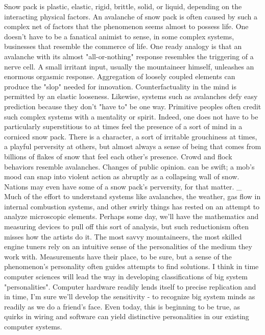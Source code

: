   Snow pack is plastic, elastic, rigid, brittle, solid, or liquid, depending on the
  interacting physical factors.
      An avalanche of snow pack is often caused by such a complex net of factors
  that the phenomenon seems almost to possess life. One doesn't have to be a
  fanatical animist to sense, in some complex systems, businesses that resemble
  the commerce of life. One ready analogy is that an avalanche with its almost
  "all-or-nothing" response resembles the triggering of a nerve cell. A small
  irritant input, usually the mountaineer himself, unleashes an enormous orgasmic
  response.
      Aggregation of loosely coupled elements can produce the "slop" needed for
  innovation. Counterfactuality in the mind is permitted by an elastic looseness.
  Likewise, systems such as avalanches defy easy prediction because they don't
  "have to" be one way.
      Primitive peoples often credit such complex systems with a mentality or
  spirit. Indeed, one does not have to be particularly superstitious to at times feel
  the presence of a sort of mind in a corniced snow pack. There is a character, a
  sort of irritable grouchiness at times, a playful perversity at others, but almost
  always a sense of being that comes from billions of flakes of snow that feel each
  other's presence.
      Crowd and flock behaviors resemble avalanches. Changes of public opinion.
  can be swift; a mob's mood can snap into violent action as abruptly as a
  collapsing wall of snow. Nations may even have some of a snow pack's
  perversity, for that matter. \_
      Much of the effort to understand systems like avalanches, the weather, gas
  flow in internal combustion systems, and other swirly things has rested on an
  attempt to analyze microscopic elements. Perhaps some day, we'll have the
  mathematics and measuring devices to pull off this sort of analysis, but such
  reductionism often misses how the artists do it. The most savvy mountaineers,
  the most skilled engine tuners rely on an intuitive sense of the personalities of
  the medium they work with. Measurements have their place, to be sure, but a
  sense of the phenomenon's personality often guides attempts to find solutions.
      I think in time computer sciences will lead the way in developing
  classifications of big system "personalities". Computer hardware readily lends
  itself to precise replication and in time, I'm sure we'll develop the sensitivity - to
  recognize big system minds as readily as we do a friend's face. Even today, this
  is beginning to be true, as quirks in wiring and software can yield distinctive
  personalities in our existing computer systems.


